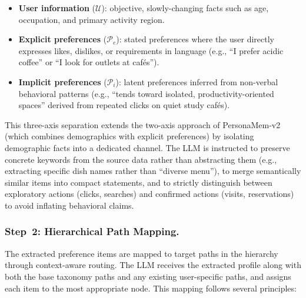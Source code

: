\documentclass[manuscript,screen,review]{acmart}
\begin{document}
\begin{itemize}
    \item \textbf{User information} ($\mathcal{U}$): objective, slowly-changing facts such as age, occupation, and primary activity region.
    \item \textbf{Explicit preferences} ($\mathcal{P}_e$): stated preferences where the user directly expresses likes, dislikes, or requirements in language (e.g., ``I prefer acidic coffee'' or ``I look for outlets at caf\'{e}s'').
    \item \textbf{Implicit preferences} ($\mathcal{P}_i$): latent preferences inferred from non-verbal behavioral patterns (e.g., ``tends toward isolated, productivity-oriented spaces'' derived from repeated clicks on quiet study caf\'{e}s).
\end{itemize}

This three-axis separation extends the two-axis approach of PersonaMem-v2~\cite{personamem-v2} (which combines demographics with explicit preferences) by isolating demographic facts into a dedicated channel. The LLM is instructed to preserve concrete keywords from the source data rather than abstracting them (e.g., extracting specific dish names rather than ``diverse menu''), to merge semantically similar items into compact statements, and to strictly distinguish between exploratory actions (clicks, searches) and confirmed actions (visits, reservations) to avoid inflating behavioral claims.

\subsubsection{Step~2: Hierarchical Path Mapping.}
The extracted preference items are mapped to target paths in the hierarchy through context-aware routing. The LLM receives the extracted profile along with both the base taxonomy paths and any existing user-specific paths, and assigns each item to the most appropriate node. This mapping follows several principles:
\end{document}
